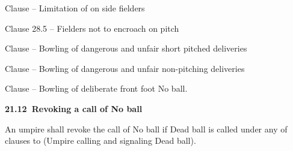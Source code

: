 \documentclass[12pt]{article}
\begin{document}
\vspace{\baselineskip}
\begin{adjustwidth}{0.04in}{0.0in}
{\fontsize{9pt}{10.8pt}\selectfont Clause – Limitation of on side fielders\par}\par

\end{adjustwidth}


\vspace{\baselineskip}
\begin{adjustwidth}{0.04in}{0.0in}
{\fontsize{9pt}{10.8pt}\selectfont Clause 28.5 – Fielders not to encroach on pitch\par}\par

\end{adjustwidth}


\vspace{\baselineskip}
\begin{adjustwidth}{0.04in}{0.0in}
{\fontsize{9pt}{10.8pt}\selectfont Clause – Bowling of dangerous and unfair short pitched deliveries\par}\par

\end{adjustwidth}


\vspace{\baselineskip}
\begin{adjustwidth}{0.04in}{0.0in}
{\fontsize{9pt}{10.8pt}\selectfont Clause – Bowling of dangerous and unfair non-pitching deliveries\par}\par

\end{adjustwidth}


\vspace{\baselineskip}
\begin{adjustwidth}{0.04in}{0.0in}
{\fontsize{9pt}{10.8pt}\selectfont Clause – Bowling of deliberate front foot No ball.\par}\par

\end{adjustwidth}


\vspace{\baselineskip}
{\fontsize{11pt}{13.2pt}\selectfont \textbf{21.12\  Revoking a call of No ball}\par}\par


\vspace{\baselineskip}
\begin{adjustwidth}{0.0in}{0.31in}
{\fontsize{9pt}{10.8pt}\selectfont An umpire shall revoke the call of No ball if Dead ball is called under any of clauses to (Umpire calling and signaling Dead ball).\par}\par

\end{adjustwidth}
\end{document}
